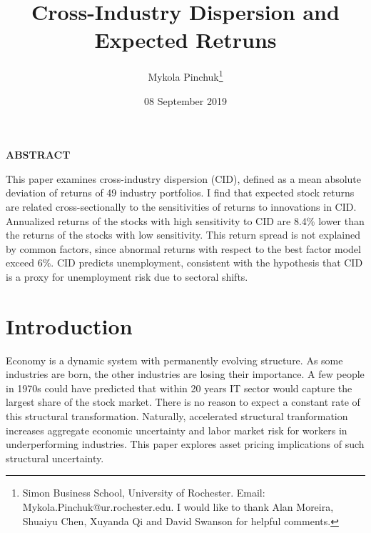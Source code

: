 \documentclass[12pt]{article}
\begin{document}
\onehalfspacing      %
\renewcommand{\footnote}{\endnote}  %

\author{Mykola Pinchuk\thanks{\rm Simon Business School, University of Rochester. Email: Mykola.Pinchuk@ur.rochester.edu. \newline I would like to thank Alan Moreira, Shuaiyu Chen, Xuyanda Qi and David Swanson for helpful comments.}}

\title{\Large \bf Cross-Industry Dispersion and Expected Retruns}

\date{08 September 2019}             %


\maketitle
\thispagestyle{empty}

\bigskip


\centerline{\bf ABSTRACT}

\small
\begin{onehalfspace}  %
  \noindent This paper examines cross-industry dispersion (CID), defined as a mean absolute deviation of returns of 49 industry portfolios. I find that expected stock returns are related cross-sectionally to the sensitivities of returns to innovations in CID. Annualized returns of the stocks with high sensitivity to CID are 8.4\% lower than the returns of the stocks with low sensitivity. This return spread is not explained by common factors, since abnormal returns with respect to the best factor model exceed 6\%. CID predicts unemployment, consistent with the hypothesis that CID is a proxy for unemployment risk due to sectoral shifts.
\end{onehalfspace}
\normalsize
\medskip


\clearpage
{}


\section{Introduction} \label{sec:Model}
Economy is a dynamic system with permanently evolving structure. As some industries are born, the other industries are losing their importance. A few people in 1970s could have predicted that within 20 years IT sector would capture the largest share of the stock market. There is no reason to expect a constant rate of this structural transformation. Naturally, accelerated structural tranformation increases aggregate economic uncertainty and labor market risk for workers in underperforming industries. This paper explores asset pricing implications of such structural uncertainty.
\end{document}
